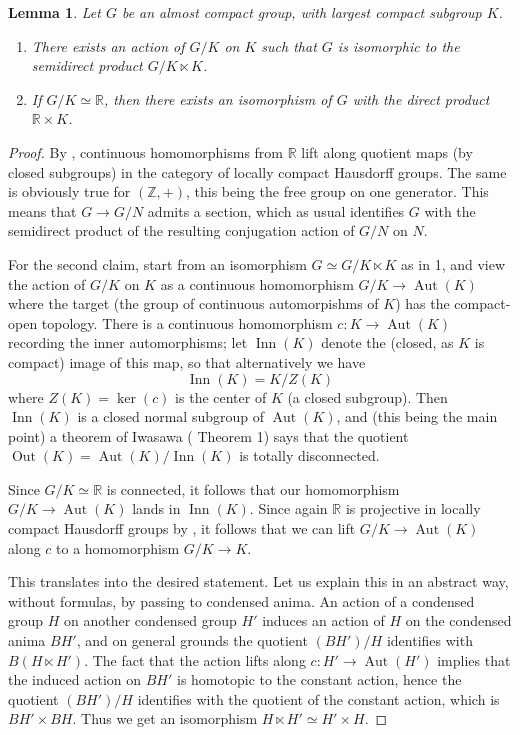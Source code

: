 \documentclass[12pt]{article}
\newtheorem{lemma}[theorem]{Lemma}
\theoremstyle{definition}
\newcommand{\on}{\operatorname}
\newcommand{\mbb}{\mathbb}
\begin{document}
\begin{lemma}\label{acompstructure}
Let $G$ be an almost compact group, with largest compact subgroup $K$.

\begin{enumerate}
\item There exists an action of $G/K$ on $K$ such that $G$ is isomorphic to the semidirect product $G/K \ltimes K$.
\item If $G/K\simeq \mbb{R}$, then there exists an isomorphism of $G$ with the direct product $\mbb{R} \times K$.
\end{enumerate}
\end{lemma}
\begin{proof}
By \cite{hofmann}, continuous homomorphisms from $\mbb{R}$ lift along quotient maps (by closed subgroups) in the category of locally compact Hausdorff groups.  The same is obviously true for $(\mbb{Z},+)$, this being the free group on one generator.  This means that $G \to G/N$ admits a section, which as usual identifies $G$ with the semidirect product of the resulting conjugation action of $G/N$ on $N$.

For the second claim, start from an isomorphism $G\simeq G/K\ltimes K$ as in 1, and view the action of $G/K$ on $K$ as a continuous homomorphism $G/K \to \on{Aut}(K)$ where the target (the group of continuous automorpishms of $K$) has the compact-open topology.  There is a continuous homomorphism $c:K\to \on{Aut}(K)$ recording the inner automorphisms; let $\on{Inn}(K)$ denote the (closed, as $K$ is compact) image of this map, so that alternatively we have
$$\on{Inn}(K) = K/Z(K)$$
where $Z(K)=\on{ker}(c)$ is the center of $K$ (a closed subgroup).  Then $\on{Inn}(K)$ is a closed normal subgroup of $\on{Aut}(K)$, and (this being the main point) a theorem of Iwasawa (\cite{iwasawa} Theorem 1) says that the quotient $\on{Out}(K) = \on{Aut}(K)/\on{Inn}(K)$ is totally disconnected.

Since $G/K\simeq \mbb{R}$ is connected, it follows that our homomorphism $G/K\to \on{Aut}(K)$ lands in $\on{Inn}(K)$.  Since again $\mbb{R}$ is projective in locally compact Hausdorff groups by \cite{hofmann}, it follows that we can lift $G/K \to \on{Aut}(K)$ along $c$ to a homomorphism $G/K \to K$.

This translates into the desired statement.  Let us explain this in an abstract way, without formulas, by passing to condensed anima.  An action of a condensed group $H$ on another condensed group $H'$ induces an action of $H$ on the condensed anima $BH'$, and on general grounds the quotient $(BH')/H$ identifies with $B( H\ltimes H')$.  The fact that the action lifts along $c:H'\to \on{Aut}(H')$ implies that the induced action on $BH'$ is homotopic to the constant action, hence the quotient $(BH')/H$ identifies with the quotient of the constant action, which is $BH' \times BH$.  Thus we get an isomorphism $H\ltimes H' \simeq H'\times H$.
\end{proof}
\end{document}
